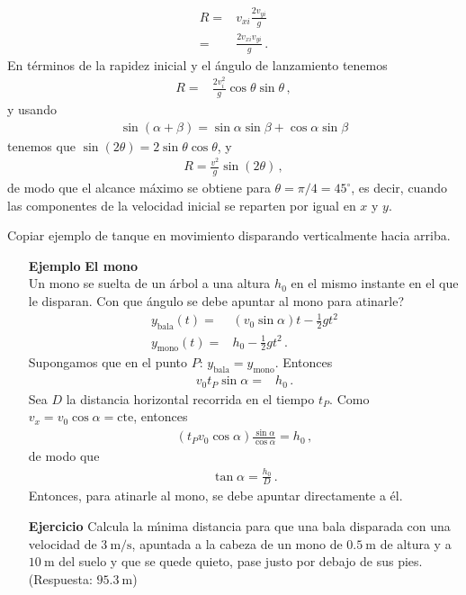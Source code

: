\begin{enumerate}
\begin{align}
  R=&v_{xi}\frac{2v_{yi}}{g}\nonumber\\
  =&\frac{2v_{xi}v_{yi}}{g}\,.
\end{align}
En términos de la rapidez inicial y el ángulo de lanzamiento tenemos
\begin{align}
  R=&\frac{2v^2_i}{g}\cos\theta\sin\theta\,,
\end{align}
y usando
\begin{align}
  \sin(\alpha+\beta)=\sin\alpha\sin\beta+\cos\alpha\sin\beta
\end{align}
tenemos que $\sin(2\theta)=2\sin\theta\cos\theta$, y
\begin{align}
  R=\frac{v^2}{g}\sin(2\theta)\,,
\end{align}
de modo que el alcance máximo se obtiene para $\theta=\pi/4=45^\circ$,
es decir, cuando las componentes de la velocidad inicial se reparten
por igual en $x$ y $y$.
  \end{enumerate}



\begin{inprogress}
  Copiar ejemplo de tanque en movimiento disparando verticalmente hacia arriba.
\end{inprogress}

\begin{itemize}
\item[\textbf{Ejemplo}] \textbf{El mono}\\
Un mono se suelta de un \'arbol a una altura $h_0$ en el mismo instante en el que le disparan. \textquestiondown Con que \'angulo se debe apuntar al mono para atinarle?
  \begin{align}
    y_{\text{bala}}(t)=&(v_0\sin\alpha)t-\tfrac{1}{2}g t^2\nonumber\\
    y_{\text{mono}}(t)=&h_0-\tfrac{1}{2}g t^2\,.
  \end{align}
Supongamos que en el punto $P$: $y_{\text{bala}}=y_{\text{mono}}$. Entonces
\begin{align}
  v_0 t_P\sin\alpha=&h_0\,.
\end{align}
Sea $D$ la distancia horizontal recorrida en el tiempo $t_P$. Como $v_x=v_0\cos\alpha=\text{cte}$, entonces
\begin{align}
  (t_Pv_0\cos\alpha)\frac{\sin\alpha}{\cos\alpha}=h_0\,,
\end{align}
de modo que
\begin{align}
  \tan\alpha=\frac{h_0}{D}\,.
\end{align}
Entonces, para atinarle al mono, se debe apuntar directamente a \'el.

\item[\textbf{Ejercicio}]Calcula la m\'\i nima distancia para que una bala disparada con una velocidad de $3\ \text{m/s}$, apuntada a la cabeza de un mono de $0.5\ $m de altura y a $10\ $m del suelo y que se quede quieto, pase justo por debajo de sus pies. (Respuesta: $95.3\ $m)
\end{itemize}





